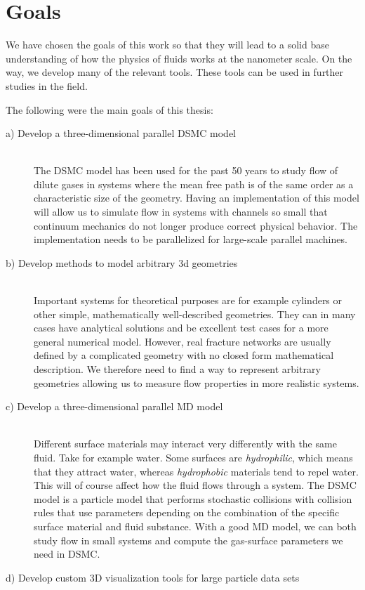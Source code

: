 \section{Goals}
We have chosen the goals of this work so that they will lead to a solid base understanding of how the physics of fluids works at the nanometer scale. On the way, we develop many of the relevant tools. These tools can be used in further studies in the field. 

The following were the main goals of this thesis:
\begin{description}
  \item[a) Develop a three-dimensional parallel DSMC model] \hfill \\
  The DSMC model has been used for the past 50 years to study flow of dilute gases in systems where the mean free path is of the same order as a characteristic size of the geometry. Having an implementation of this model will allow us to simulate flow in systems with channels so small that continuum mechanics do not longer produce correct physical behavior. The implementation needs to be parallelized for large-scale parallel machines.
  \item[b) Develop methods to model arbitrary 3d geometries] \hfill \\
  Important systems for theoretical purposes are for example cylinders or other simple, mathematically well-described geometries. They can in many cases have analytical solutions and be excellent test cases for a more general numerical model. However, real fracture networks are usually defined by a complicated geometry with no closed form mathematical description. We therefore need to find a way to represent arbitrary geometries allowing us to measure flow properties in more realistic systems.
  \item[c) Develop a three-dimensional parallel MD model] \hfill \\
  Different surface materials may interact very differently with the same fluid. Take for example water. Some surfaces are \textit{hydrophilic}, which means that they attract water, whereas \textit{hydrophobic} materials tend to repel water. This will of course affect how the fluid flows through a system. The DSMC model is a particle model that performs stochastic collisions with collision rules that use parameters depending on the combination of the specific surface material and fluid substance. With a good MD model, we can both study flow in small systems and compute the gas-surface parameters we need in DSMC. 
  \item[d) Develop custom 3D visualization tools for large particle data sets] \hfill \\

\end{description}
